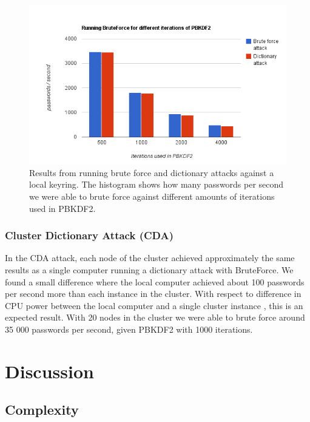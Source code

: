 \documentclass[pdftex,english,10pt,b5paper,twoside]{book}
\begin{document}
\begin{figure}[!h]
\centering
\includegraphics[scale=0.55]{bf.png}
\caption{Results from running brute force and dictionary attacks against a local
keyring. The histogram shows how many passwords per second we were able to brute
force against different amounts of iterations used in PBKDF2.}
\label{fig:bfres}
\end{figure}
\subsection{Cluster Dictionary Attack (CDA)}
In the CDA attack, each node of the cluster achieved approximately the same results as a single computer
running a dictionary attack with BruteForce. We found a small difference where
the local computer achieved about 100 passwords per second more than each
instance in the cluster. With respect to difference in CPU power between the
local computer and a single cluster instance \cite{cpubench}, this is an expected
result. With 20 nodes in the cluster we were able to brute force around 35 000
passwords per second, given PBKDF2 with 1000 iterations.

\chapter{Discussion}
\section{Complexity}

\end{document}
